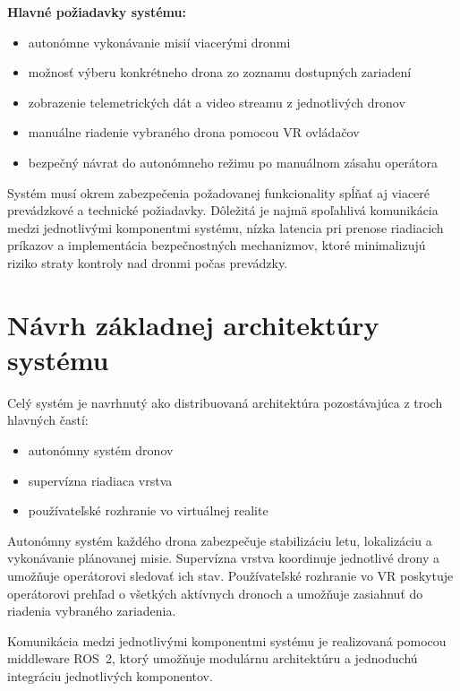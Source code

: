 \documentclass[a4paper,12pt]{article}
\begin{document}
\textbf{Hlavné požiadavky systému:}

\begin{itemize}
    \item autonómne vykonávanie misií viacerými dronmi
    \item možnosť výberu konkrétneho drona zo zoznamu dostupných zariadení
    \item zobrazenie telemetrických dát a video streamu z jednotlivých dronov
    \item manuálne riadenie vybraného drona pomocou VR ovládačov
    \item bezpečný návrat do autonómneho režimu po manuálnom zásahu operátora
\end{itemize}

Systém musí okrem zabezpečenia požadovanej funkcionality spĺňať aj viaceré prevádzkové a technické požiadavky. 
Dôležitá je najmä spoľahlivá komunikácia medzi jednotlivými komponentmi systému, 
nízka latencia pri prenose riadiacich príkazov a implementácia bezpečnostných mechanizmov, 
ktoré minimalizujú riziko straty kontroly nad dronmi počas prevádzky.

\section{Návrh základnej architektúry systému}

Celý systém je navrhnutý ako distribuovaná architektúra pozostávajúca z troch hlavných častí:

\begin{itemize}
\item autonómny systém dronov
\item supervízna riadiaca vrstva
\item používateľské rozhranie vo virtuálnej realite
\end{itemize}

Autonómny systém každého drona zabezpečuje stabilizáciu letu, lokalizáciu a vykonávanie plánovanej misie. 
Supervízna vrstva koordinuje jednotlivé drony a umožňuje operátorovi sledovať ich stav. 
Používateľské rozhranie vo VR poskytuje operátorovi prehľad o všetkých aktívnych dronoch a 
umožňuje zasiahnuť do riadenia vybraného zariadenia.

Komunikácia medzi jednotlivými komponentmi systému je realizovaná pomocou middleware ROS~2, 
ktorý umožňuje modulárnu architektúru a jednoduchú integráciu jednotlivých komponentov.
\end{document}
